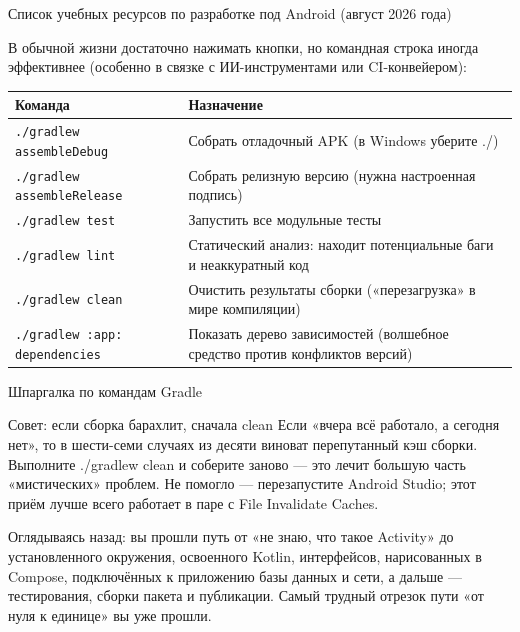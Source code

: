 \begin{center}\small\color{gray}Список учебных ресурсов по разработке под Android (август 2026 года)\end{center}


В обычной жизни достаточно нажимать кнопки, но командная строка иногда эффективнее (особенно в связке с ИИ-инструментами или CI-конвейером):

\begin{center}
\begin{tabularx}{\linewidth}{|X|X|}
\hline
\textbf{Команда} & \textbf{Назначение} \tabularnewline
\hline
\texttt{.\allowbreak /\allowbreak gradlew assembleDebug} & Собрать отладочный APK (в Windows уберите ./) \tabularnewline
\texttt{.\allowbreak /\allowbreak gradlew assembleRelease} & Собрать релизную версию (нужна настроенная подпись) \tabularnewline
\texttt{.\allowbreak /\allowbreak gradlew test} & Запустить все модульные тесты \tabularnewline
\texttt{.\allowbreak /\allowbreak gradlew lint} & Статический анализ: находит потенциальные баги и неаккуратный код \tabularnewline
\texttt{.\allowbreak /\allowbreak gradlew clean} & Очистить результаты сборки («перезагрузка» в мире компиляции) \tabularnewline
\texttt{.\allowbreak /\allowbreak gradlew :app: dependencies} & Показать дерево зависимостей (волшебное средство против конфликтов версий) \tabularnewline
\hline
\end{tabularx}
\end{center}

\begin{center}\small\color{gray}Шпаргалка по командам Gradle\end{center}

\begin{tcbinfo}{Совет: если сборка барахлит, сначала clean}
Если «вчера всё работало, а сегодня нет», то в шести-семи случаях из десяти виноват перепутанный кэш сборки. Выполните ./gradlew clean и соберите заново — это лечит большую часть «мистических» проблем. Не помогло — перезапустите Android Studio; этот приём лучше всего работает в паре с File Invalidate Caches.

\end{tcbinfo}



Оглядываясь назад: вы прошли путь от «не знаю, что такое Activity» до установленного окружения, освоенного Kotlin, интерфейсов, нарисованных в Compose, подключённых к приложению базы данных и сети, а дальше — тестирования, сборки пакета и публикации. Самый трудный отрезок пути «от нуля к единице» вы уже прошли.

